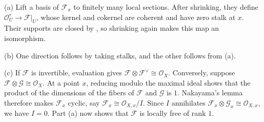 (a) Lift a basis of $\mathcal F_x$ to finitely many local sections. After shrinking, they define $\mathcal O_U^r\to\mathcal F|_U$, whose kernel and cokernel are coherent and have zero stalk at $x$. Their supports are closed by , so shrinking again makes this map an isomorphism.

(b) One direction follows by taking stalks, and the other follows from (a).

(c) If $\mathcal F$ is invertible, evaluation gives $\mathcal F\otimes\mathcal F^\vee\cong\mathcal O_X$. Conversely, suppose $\mathcal F\otimes\mathcal G\cong\mathcal O_X$. At a point $x$, reducing modulo the maximal ideal shows that the product of the dimensions of the fibers of $\mathcal F$ and $\mathcal G$ is $1$. Nakayama's lemma therefore makes $\mathcal F_x$ cyclic, say $\mathcal F_x\cong\mathcal O_{X,x}/I$. Since $I$ annihilates $\mathcal F_x\otimes\mathcal G_x\cong\mathcal O_{X,x}$, we have $I=0$. Part (a) now shows that $\mathcal F$ is locally free of rank $1$.
